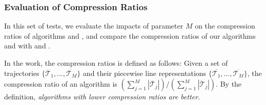 \subsubsection{Evaluation of Compression Ratios}


In this set of tests, we evaluate the impacts of parameter $M$ on the compression ratios of algorithms \cist and \cista, and compare the compression ratios of our algorithms \cist and \cista with \dps and \squishe.

In the work, the compression ratios is defined as follows: Given a set of trajectories $\{\dddot{\mathcal{T}_1}, \ldots, \dddot{\mathcal{T}_M}\}$ and their piecewise line representations $\{\overline{\mathcal{T}_1}, \ldots, \overline{\mathcal{T}_M}\}$, the compression ratio of an algorithm is $(\sum_{j=1}^{M} |\overline{\mathcal{T}}_j |)/(\sum_{j=1}^{M} |\dddot{\mathcal{T}}_j |)$.
By the definition, \emph{algorithms with lower compression ratios are better}.







